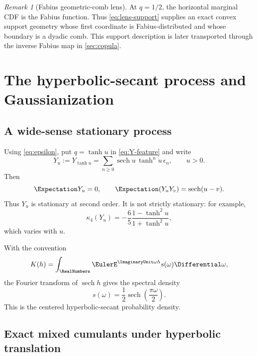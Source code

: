 \documentclass[11pt,a4paper]{article}
\theoremstyle{definition}
\theoremstyle{remark}
\newtheorem{remark}[theorem]{Remark}
\newcommand{\sech}{\operatorname{sech}}
\begin{document}
\begin{remark}[Fabius geometric-comb lens]
At $q=1/2$, the horizontal marginal CDF is the Fabius function.  Thus \eqref{eq:lens-support} supplies an exact convex support geometry whose first coordinate is Fabius-distributed and whose boundary is a dyadic comb.  This support description is later transported through the inverse Fabius map in \cref{sec:copula}.
\end{remark}

\section{The hyperbolic-secant process and Gaussianization}
\label{sec:gaussianization}

\subsection{A wide-sense stationary process}

Using \eqref{eq:epsilon}, put $q=\tanh u$ in \eqref{eq:Y-feature} and write
\begin{equation}
  Y_u:=Y_{\tanh u}
   =\sum_{n\ge0}\sech u\,\tanh^n u\,\epsilon_n,
  \qquad u>0.
  \label{eq:Yu}
\end{equation}
Then
\begin{equation}
  \Expectation Y_u=0,
  \qquad
  \Expectation(Y_uY_v)=\sech(u-v).
  \label{eq:sech-covariance}
\end{equation}
Thus $Y_u$ is stationary at second order.  It is not strictly stationary: for example,
\begin{equation}
  \kappa_4(Y_u)
   =-\frac65\frac{1-\tanh^2u}{1+\tanh^2u},
  \label{eq:nonstationary-fourth}
\end{equation}
which varies with $u$.

With the convention
\[
  K(h)=\int_{\RealNumbers}\EulerE^{\ImaginaryUnit\omega h}s(\omega)\Differential\omega,
\]
the Fourier transform of $\sech h$ gives the spectral density
\begin{equation}
  s(\omega)=\frac12\sech\!\left(\frac{\pi\omega}{2}\right).
  \label{eq:sech-spectral}
\end{equation}
This is the centered hyperbolic-secant probability density.

\subsection{Exact mixed cumulants under hyperbolic translation}
\end{document}
